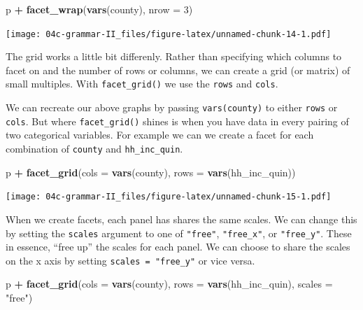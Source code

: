 \documentclass[
]{book}
\newenvironment{Shaded}{\begin{snugshade}}{\end{snugshade}}
\newcommand{\DataTypeTok}[1]{\textcolor[rgb]{0.13,0.29,0.53}{#1}}
\newcommand{\DecValTok}[1]{\textcolor[rgb]{0.00,0.00,0.81}{#1}}
\newcommand{\KeywordTok}[1]{\textcolor[rgb]{0.13,0.29,0.53}{\textbf{#1}}}
\newcommand{\NormalTok}[1]{#1}
\newcommand{\OperatorTok}[1]{\textcolor[rgb]{0.81,0.36,0.00}{\textbf{#1}}}
\newcommand{\StringTok}[1]{\textcolor[rgb]{0.31,0.60,0.02}{#1}}
\begin{document}
\begin{Shaded}
\begin{Highlighting}[]
\NormalTok{p }\OperatorTok{+}
\StringTok{  }\KeywordTok{facet\_wrap}\NormalTok{(}\KeywordTok{vars}\NormalTok{(county), }\DataTypeTok{nrow =} \DecValTok{3}\NormalTok{)}
\end{Highlighting}
\end{Shaded}

\texttt{[image: 04c-grammar-II\_files/figure-latex/unnamed-chunk-14-1.pdf]}

The grid works a little bit differenly. Rather than specifying which columns to facet on and the number of rows or columns, we can create a grid (or matrix) of small multiples. With \texttt{facet\_grid()} we use the \texttt{rows} and \texttt{cols}.

We can recreate our above graphs by passing \texttt{vars(county)} to either \texttt{rows} or \texttt{cols}. But where \texttt{facet\_grid()} shines is when you have data in every pairing of two categorical variables. For example we can we create a facet for each combination of \texttt{county} and \texttt{hh\_inc\_quin}.

\begin{Shaded}
\begin{Highlighting}[]
\NormalTok{p }\OperatorTok{+}
\StringTok{  }\KeywordTok{facet\_grid}\NormalTok{(}\DataTypeTok{cols =} \KeywordTok{vars}\NormalTok{(county),}
             \DataTypeTok{rows =} \KeywordTok{vars}\NormalTok{(hh\_inc\_quin))}
\end{Highlighting}
\end{Shaded}

\texttt{[image: 04c-grammar-II\_files/figure-latex/unnamed-chunk-15-1.pdf]}

When we create facets, each panel has shares the same scales. We can change this by setting the \texttt{scales} argument to one of \texttt{"free"}, \texttt{"free\_x"}, or \texttt{"free\_y"}. These in essence, ``free up'' the scales for each panel. We can choose to share the scales on the x axis by setting \texttt{scales\ =\ "free\_y"} or vice versa.

\begin{Shaded}
\begin{Highlighting}[]
\NormalTok{p }\OperatorTok{+}
\StringTok{  }\KeywordTok{facet\_grid}\NormalTok{(}\DataTypeTok{cols =} \KeywordTok{vars}\NormalTok{(county),}
             \DataTypeTok{rows =} \KeywordTok{vars}\NormalTok{(hh\_inc\_quin),}
             \DataTypeTok{scales =} \StringTok{"free"}\NormalTok{)}
\end{Highlighting}
\end{Shaded}
\end{document}
